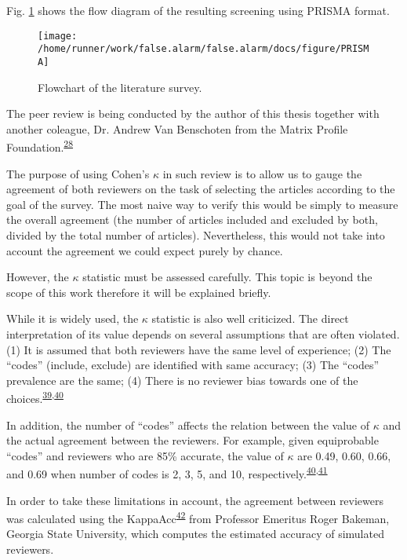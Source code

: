 \documentclass[12pt,twoside]{fmupthesis}
\begin{document}
Fig. \ref{fig:prisma} shows the flow diagram of the resulting screening using PRISMA format.
\begin{figure}

{\centering \texttt{[image: /home/runner/work/false.alarm/false.alarm/docs/figure/PRISMA]} 

}

\caption{Flowchart of the literature survey.}\label{fig:prisma}
\end{figure}
The peer review is being conducted by the author of this thesis together with another coleague, Dr.
Andrew Van Benschoten from the Matrix Profile Foundation.\textsuperscript{\protect\hyperlink{ref-mpf2020}{28}}

The purpose of using Cohen's \(\kappa\) in such review is to allow us to gauge the agreement of both
reviewers on the task of selecting the articles according to the goal of the survey. The most naive
way to verify this would be simply to measure the overall agreement (the number of articles included
and excluded by both, divided by the total number of articles). Nevertheless, this would not take
into account the agreement we could expect purely by chance.

However, the \(\kappa\) statistic must be assessed carefully. This topic is beyond the scope of this work
therefore it will be explained briefly.

While it is widely used, the \(\kappa\) statistic is also well criticized. The direct interpretation of
its value depends on several assumptions that are often violated. (1) It is assumed that both
reviewers have the same level of experience; (2) The ``codes'' (include, exclude) are identified with
same accuracy; (3) The ``codes'' prevalence are the same; (4) There is no reviewer bias towards one of
the choices.\textsuperscript{\protect\hyperlink{ref-Sim2005}{39},\protect\hyperlink{ref-Bakeman1997}{40}}

In addition, the number of ``codes'' affects the relation between the value of \(\kappa\) and the actual
agreement between the reviewers. For example, given equiprobable ``codes'' and reviewers who are 85\%
accurate, the value of \(\kappa\) are 0.49, 0.60, 0.66, and 0.69 when number of codes is 2, 3, 5, and 10,
respectively.\textsuperscript{\protect\hyperlink{ref-Bakeman1997}{40},\protect\hyperlink{ref-Morgan2019}{41}}

In order to take these limitations in account, the agreement between reviewers was calculated using
the KappaAcc\textsuperscript{\protect\hyperlink{ref-Bakeman2011}{42}} from Professor Emeritus Roger Bakeman, Georgia State University, which
computes the estimated accuracy of simulated reviewers.
\end{document}

